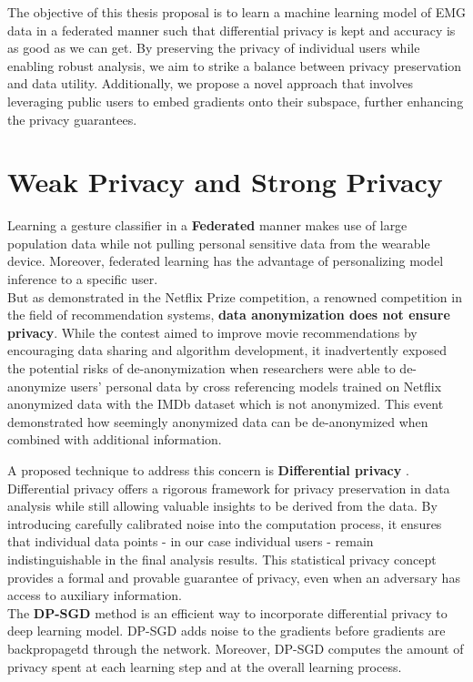\documentclass[fourier]{_style/dissertation}
\begin{document}
The objective of this thesis proposal is to learn a machine learning model of EMG data in a federated manner such that differential privacy is kept and accuracy is as good as we can get. By preserving the privacy of individual users while enabling robust analysis, we aim to strike a balance between privacy preservation and data utility. Additionally, we propose a novel approach that involves leveraging public users to embed gradients onto their subspace, further enhancing the privacy guarantees.\\

\section{Weak Privacy and Strong Privacy}
Learning a gesture classifier in a \textbf{Federated} manner makes use of large population data while not pulling personal sensitive data from the wearable device. Moreover, federated learning has the advantage of personalizing model inference to a specific user. \\

But as demonstrated in the Netflix Prize competition, a renowned competition in the field of recommendation systems, \textbf{data anonymization does not ensure privacy}. While the contest aimed to improve movie recommendations by encouraging data sharing and algorithm development, it inadvertently exposed the potential risks of de-anonymization when researchers were able to de-anonymize users' personal data by cross referencing models trained on Netflix anonymized data with the IMDb dataset which is not anonymized. This event demonstrated how seemingly anonymized data can be de-anonymized when combined with additional information. 

A proposed technique to address this concern is \textbf{Differential privacy} \cite{Dwork2013ThePrivacy}. \\
Differential privacy offers a rigorous framework for privacy preservation in data analysis while still allowing valuable insights to be derived from the data. By introducing carefully calibrated noise into the computation process, it ensures that individual data points - in our case individual users -  remain indistinguishable in the final analysis results. This statistical privacy concept provides a formal and provable guarantee of privacy, even when an adversary has access to auxiliary information.\\

The \textbf{DP-SGD} \cite{Abadi2016DeepPrivacy} method is an efficient way to incorporate differential privacy to deep learning model. DP-SGD adds noise to the gradients before gradients are backpropagetd through the network. Moreover, DP-SGD computes the amount of privacy spent at each learning step and at the overall learning process. 
\end{document}
